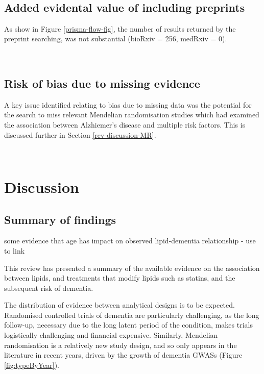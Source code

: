 \documentclass[a4paper, twoside]{templates/ociamthesis}
\begin{document}
~

\hypertarget{sys-rev-including-preprints}{%
\subsection{Added evidental value of including preprints}\label{sys-rev-including-preprints}}

As show in Figure \ref{prisma-flow-fig}, the number of results returned by the preprint searching, was not substantial (bioRxiv = 256, medRxiv = 0).

~

\hypertarget{risk-of-bias-due-to-missing-evidence-1}{%
\subsection{Risk of bias due to missing evidence}\label{risk-of-bias-due-to-missing-evidence-1}}

A key issue identified relating to bias due to missing data was the potential for the search to miss relevant Mendelian randomisation studies which had examined the association between Alzhiemer's disease and multiple risk factors. This is discussed further in Section \ref{rev-discussion-MR}.

~

\hypertarget{discussion-1}{%
\section{Discussion}\label{discussion-1}}

\hypertarget{summary-of-findings}{%
\subsection{Summary of findings}\label{summary-of-findings}}

some evidence that age has impact on observed lipid-dementia relationship - use to link

This review has presented a summary of the available evidence on the association between lipids, and treatments that modify lipids such as statins, and the subsequent risk of dementia.

The distribution of evidence between analytical designs is to be expected. Randomised controlled trials of dementia are particularly challenging, as the long follow-up, necessary due to the long latent period of the condition, makes trials logistically challenging and financial expensive. Similarly, Mendelian randomisation is a relatively new study design, and so only appears in the literature in recent years, driven by the growth of dementia GWASs (Figure \ref{fig:typeByYear}).
\end{document}
